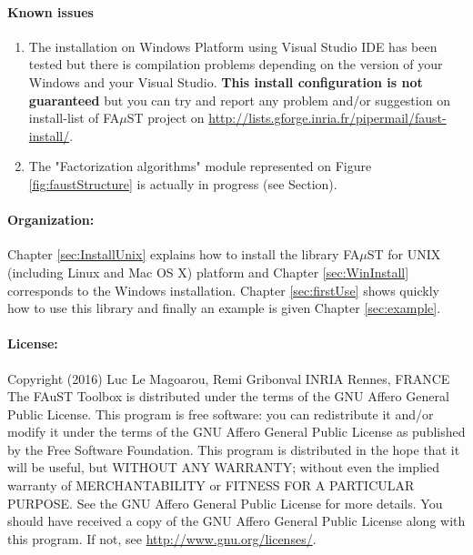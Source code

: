 \paragraph{Known issues}
\begin{enumerate}
\item The installation on Windows Platform using Visual Studio IDE has been tested but there is compilation problems depending on the version of your Windows and your Visual Studio. \textbf{This install configuration is not guaranteed} but you can try and report any problem and/or suggestion on install-list of FA$\mu$ST project on \url{http://lists.gforge.inria.fr/pipermail/faust-install/}. 
\item The "Factorization algorithms" module represented on Figure \ref{fig:faustStructure} is actually in progress (see Section). 
\end{enumerate}


\paragraph{Organization:}Chapter \ref{sec:InstallUnix} explains how to install the library FA$\mu$ST for UNIX (including Linux and Mac OS X) platform  and Chapter \ref{sec:WinInstall} corresponds to the Windows installation. Chapter \ref{sec:firstUse} shows quickly how to use this library and finally an example is given Chapter \ref{sec:example}. 

\paragraph{License:}Copyright (2016) Luc Le Magoarou, Remi Gribonval INRIA Rennes, FRANCE \\
The FAuST Toolbox is distributed under the terms of the GNU Affero General Public License. This program is free software: you can redistribute it and/or modify it under the terms of the GNU Affero General Public License as published by the Free Software Foundation. This program is distributed in the hope that it will be useful, but WITHOUT ANY WARRANTY; without even the implied warranty of MERCHANTABILITY or FITNESS FOR A PARTICULAR PURPOSE.  See the GNU Affero General Public License for more details. You should have received a copy of the GNU Affero General Public License along with this program.  If not, see \url{http://www.gnu.org/licenses/}.
